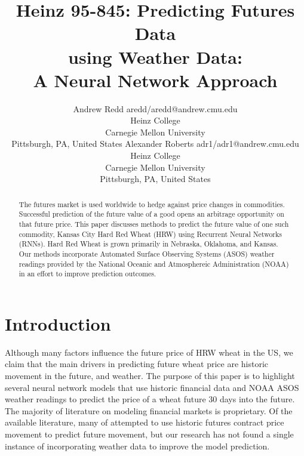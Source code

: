 \documentclass[twoside,11pt]{article}
\begin{document}
\title{Heinz 95-845: Predicting Futures Data\\ using Weather Data:\\ A Neural Network Approach}

\author{\name Andrew Redd \email aredd/aredd@andrew.cmu.edu \\
       \addr Heinz College\\
       Carnegie Mellon University\\
       Pittsburgh, PA, United States
       \AND
       \name Alexander Roberts \email adr1/adr1@andrew.cmu.edu \\
       \addr Heinz College\\
       Carnegie Mellon University\\
       Pittsburgh, PA, United States}


\maketitle

\begin{abstract}
  The futures market is used worldwide to hedge against price changes in commodities. Successful prediction of the future value of a good opens an arbitrage opportunity on that future price. This paper discusses methods to predict the future value of one such commodity, Kansas City Hard Red Wheat (HRW) using Recurrent Neural Networks (RNNs). Hard Red Wheat is grown primarily in Nebraska, Oklahoma, and Kansas. Our methods incorporate Automated Surface Observing Systems (ASOS) weather readings provided by the National Oceanic and Atmosphereic Administration (NOAA) in an effort to improve prediction outcomes.
\end{abstract}

\section{Introduction}

Although many factors influence the future price of HRW wheat in the US, we claim that the main drivers in predicting future wheat price are historic movement in the future, and weather. The purpose of this paper is to highlight several neural network models that use historic financial data and NOAA ASOS weather readings to predict the price of a wheat future 30 days into the future. The majority of literature on modeling financial markets is proprietary. Of the available literature, many of attempted to use historic futures contract price movement to predict future movement, but our research has not found a single instance of incorporating weather data to improve the model prediction. 
\end{document}

